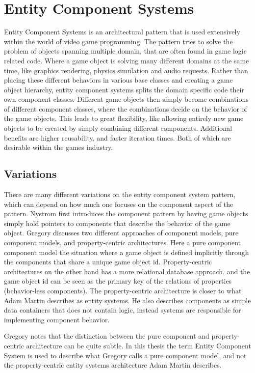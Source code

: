 \section{Entity Component Systems}
Entity Component Systems is an architectural pattern that is used extensively within the world of video game programming.
The pattern tries to solve the problem of objects spanning multiple domain, that are often found in game logic related code.
Where a game object is solving many different domains at the same time, like graphics rendering, physics simulation and
audio requests.
Rather than placing these different behaviors in various base classes and creating a game object hierarchy,
entity component systems splits the domain specific code their own component classes.
Different game objects then simply become combinations of different component classes,
where the combinations decide on the behavior of the game objects.
This leads to great flexibility, like allowing entirely new game objects to be created by simply combining different components.
Additional benefits are higher reusability, and faster iteration times.
Both of which are desirable within the games industry.

\subsection{Variations}
There are many different variations on the entity component system pattern, which can depend on how much one focuses on
the component aspect of the pattern.
Nystrom\cite[component]{game_programming_patterns} first introduces the component pattern by having game objects simply hold
pointers to components that describe the behavior of the game object.
Gregory\cite[p. 886]{game_engine_architecture} discusses two different approaches of component models, pure component models,
and property-centric architectures. Here a pure component component model the situation where a game object is defined
implicitly through the components that share a unique game object id.
Property-centric architectures on the other hand has a more relational database approach, and the game object id can be seen
as the primary key of the relations of properties (behavior-less components).
The property-centric architecture is closer to what Adam Martin\cite{t_machine_entity_systems} describes as entity systems.
He also describes components as simple data containers that does not contain logic,
instead systems are responsible for implementing component behavior.

Gregory\cite[p. 890]{game_engine_architecture} notes that the distinction between the pure component and property-centric
architecture can be quite subtle. 
In this thesis the term Entity Component System is used to describe what Gregory calls a pure component model,
and not the property-centric entity systems architecture Adam Martin describes.
